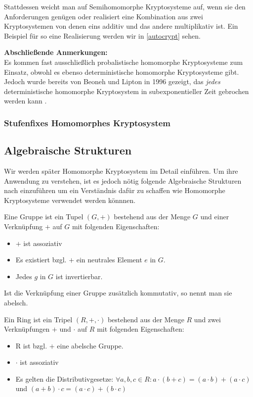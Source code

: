 Stattdessen weicht man auf Semihomomorphe Kryptosysteme auf, wenn sie den Anforderungen genügen oder realisiert eine Kombination aus zwei Kryptosystemen von denen eins additiv und das andere multiplikativ ist. Ein Beispiel für so eine Realisierung werden wir in \ref{autocrypt} sehen.


\textbf{Abschließende Anmerkungen:}\\
Es kommen fast ausschließlich probalistische homomorphe Kryptosysteme zum Einsatz, obwohl es ebenso deterministische homomorphe Kryptosysteme gibt. Jedoch wurde bereits von Beoneh und Lipton in 1996 gezeigt, das \textit{jedes} deterministische homomorphe Kryptosystem in subexponentieller Zeit gebrochen werden kann \cite{boneh1996algorithms}. 

\subsubsection{Stufenfixes Homomorphes Kryptosystem}
\label{LHE}

\subsection{Algebraische Strukturen}
\label{MG}

Wir werden später Homomorphe Kryptosystem im Detail einführen. Um ihre Anwendung zu verstehen, ist es jedoch nötig folgende Algebraische Strukturen nach \cite{tr2015la} einzuführen um ein Verständnis dafür zu schaffen wie Homomorphe Kryptosysteme verwendet werden könnnen.

\begin{theorem}[Gruppe]
	Eine Gruppe ist ein Tupel $(G,+)$ bestehend aus der Menge $G$ und einer Verknüpfung $+$ auf $G$ mit folgenden Eigenschaften:
	\begin{itemize}
		\item $+$ ist assoziativ
		\item Es existiert bzgl. $+$ ein neutrales Element $e$ in $G$.
		\item Jedes $g$ in $G$ ist invertierbar.
	\end{itemize}
	
	Ist die Verknüpfung einer Gruppe zusätzlich kommutativ, so nennt man sie abelsch.
	
\end{theorem}

\begin{theorem}[Ring]
	\label{Ring}
	Ein Ring ist ein Tripel $(R,+,\cdot)$ bestehend aus der Menge $R$ und zwei Verknüpfungen $+$ und $\cdot$ auf $R$ mit folgenden Eigenschaften:
	\begin{itemize}
		\item R ist bzgl. $+$ eine abelsche Gruppe.
		\item $\cdot$ ist assoziativ
		\item Es gelten die Distributivgesetze: $\forall a,b,c\in R: a\cdot(b+c)=(a\cdot b)+(a\cdot c)$ und $(a+b)\cdot c = (a\cdot c)+(b\cdot c)$
	\end{itemize}
\end{theorem}

